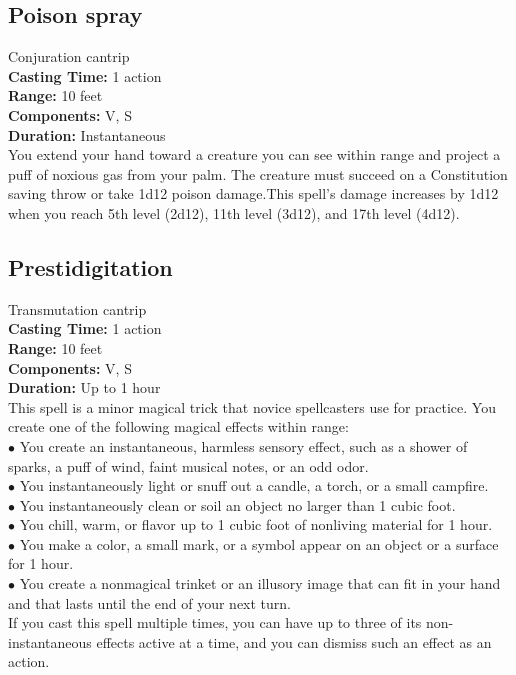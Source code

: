 \documentclass[11pt, A4paper, english]{article}
\begin{document}
		\subsection{Poison spray}
Conjuration cantrip \\
\textbf{Casting Time:} 1 action \\
\textbf{Range:} 10 feet \\
\textbf{Components:} V, S \\
\textbf{Duration:} Instantaneous \\
You extend your hand toward a creature you can see within range and project a puff of noxious gas from your palm. The creature must succeed on a Constitution saving throw or take 1d12 poison damage.This spell’s damage increases by 1d12 when you reach 5th level (2d12), 11th level (3d12), and 17th level (4d12).

		\subsection{Prestidigitation}
Transmutation cantrip \\
\textbf{Casting Time:} 1 action \\
\textbf{Range:} 10 feet \\
\textbf{Components:} V, S \\
\textbf{Duration:} Up to 1 hour \\
This spell is a minor magical trick that novice spellcasters use for practice. You create one of the following magical effects within range: \\
\indent $\bullet$ You create an instantaneous, harmless sensory effect, such as a shower of sparks, a puff of wind, faint musi­cal notes, or an odd odor. \\
\indent $\bullet$ You instantaneously light or snuff out a candle, a torch, or a small campfire. \\
\indent $\bullet$ You instantaneously clean or soil an object no larger than 1  cubic foot. \\
\indent $\bullet$ You chill, warm, or flavor up to 1 cubic foot of nonliv­ing material for 1 hour. \\
\indent $\bullet$ You make a color, a small mark, or a symbol appear on an object or a surface for 1 hour. \\
\indent $\bullet$ You create a nonmagical trinket or an illusory image that can fit in your hand and that lasts until the end of your next turn. \\
If you cast this spell multiple times, you can have up to three of its non-instantaneous effects active at a time, and you can dismiss such an effect as an action.
\end{document}
